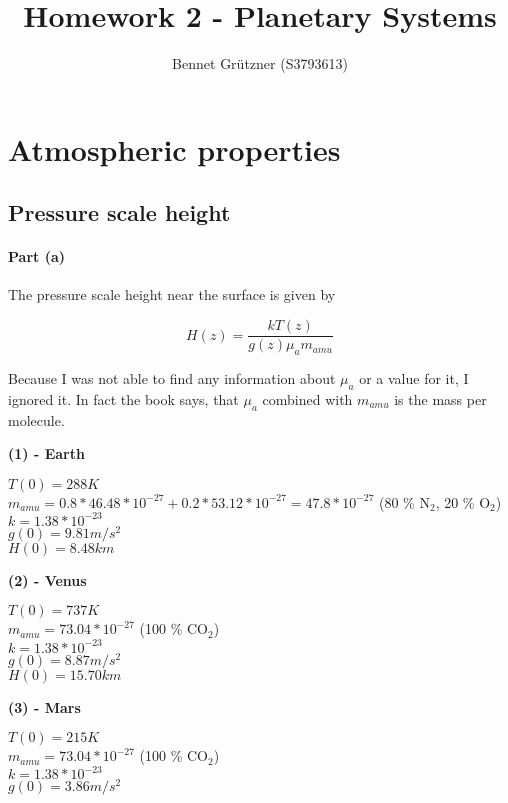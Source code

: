 \documentclass[12pt,a4paper]{article}
\author{Bennet Grützner (S3793613)}
\title{Homework 2 - Planetary Systems}
\begin{document}
\maketitle
\tableofcontents

\section{Atmospheric properties}

\subsection{Pressure scale height}

\paragraph{Part (a)}

The pressure scale height near the surface is given by 

$$H(z) = \frac{k T(z)}{g(z) \mu_a m_{amu}}$$

Because I was not able to find any information about $\mu_a$ or a value for it, I ignored it. In fact the book says, that $\mu_a$ combined with $m_{amu}$ is the mass per molecule.

\textbf{(1) - Earth}

$T(0) = 288 K$ \\
$m_{amu} = 0.8 * 46.48 * 10^{-27} + 0.2 * 53.12 * 10^{-27} = 47.8 * 10^{-27}$ (80 \% N${}_2$, 20 \% O${}_2$) \\
$k = 1.38 * 10^{-23}$ \\
$g(0) = 9.81 m/s^2$ \\

$H(0) = 8.48 km$

\textbf{(2) - Venus}

$T(0) = 737 K$ \\
$m_{amu} = 73.04 * 10^{-27}$ (100 \% CO${}_2$) \\
$k = 1.38 * 10^{-23}$ \\
$g(0) = 8.87 m/s^2$ \\


$H(0) = 15.70 km$

\textbf{(3) - Mars}

$T(0) = 215 K$ \\
$m_{amu} = 73.04 * 10^{-27}$ (100 \% CO${}_2$) \\
$k = 1.38 * 10^{-23}$ \\
$g(0) = 3.86 m/s^2$ \\
\end{document}

